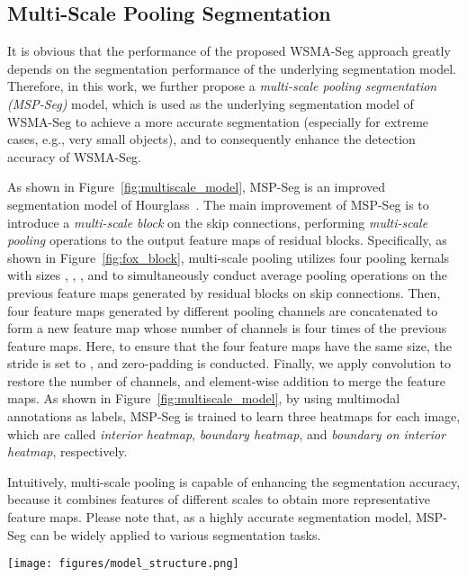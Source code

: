 \documentclass{article}
\begin{document}
\subsection{Multi-Scale Pooling Segmentation}
It is obvious that the performance of the proposed WSMA-Seg approach  greatly depends on the segmentation performance of the underlying segmentation model. Therefore, in this work, we further propose a \emph{multi-scale pooling segmentation (MSP-Seg)} model, which is used as the underlying segmentation model of WSMA-Seg to achieve a more accurate segmentation (especially for extreme cases, e.g., very small objects), and to consequently enhance the detection accuracy of WSMA-Seg. 

As shown in Figure~\ref{fig:multiscale_model}, MSP-Seg is an improved segmentation model of Hourglass~\cite{newell2016stacked}. The main improvement of MSP-Seg is to introduce a \emph{multi-scale block} on the skip connections, performing \emph{multi-scale pooling} operations to the output feature maps of residual blocks. Specifically, as shown in Figure~\ref{fig:fox_block}, multi-scale pooling utilizes four pooling kernals with sizes , , , and  to simultaneously conduct average pooling operations on the previous feature maps generated by residual blocks on skip connections. Then, four feature maps generated by different pooling channels are concatenated to form a new feature map whose number of channels is four times of the previous feature maps. Here, to ensure that the four feature maps have the same size, the stride is set to , and zero-padding is conducted. Finally, we apply  convolution  to restore the number of channels, and element-wise addition to merge the feature maps. As shown in Figure~\ref{fig:multiscale_model}, by using multimodal annotations as labels, MSP-Seg is trained to learn three heatmaps for each image, which are called \emph{interior heatmap}, \emph{boundary heatmap}, and \emph{boundary on interior heatmap}, respectively.

Intuitively, multi-scale pooling is capable of enhancing the segmentation accuracy, because it combines features of different scales to obtain more representative feature maps. Please note that, as a highly accurate segmentation model, MSP-Seg can be widely applied to  various segmentation tasks.



\begin{figure*}
  \centering
  \texttt{[image: figures/model\_structure.png]}
  \caption{Multi-scale pooling segmentation model.\label{fig:multiscale_model}}
\end{figure*}
\end{document}
